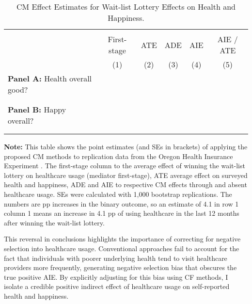 \begin{table}[h!]
    \singlespacing
    \centering
    \small
    \caption{CM Effect Estimates for Wait-list Lottery Effects on Health and Happiness.}
    \begin{tabular}{l c c c c c}
        \\[-1.8ex]\hline \hline \\[-1.8ex] 
        & First-stage & ATE & ADE & AIE & AIE / ATE \\
        \cmidrule(lr){2-6}
        & (1) & (2) & (3) & (4) & (5) \\
        \midrule
        \multicolumn{1}{l}{\textbf{Panel A:} Health overall good?} \\
        
        \\[-1.8ex]\hline \\[-1.8ex]
        \multicolumn{1}{l}{\textbf{Panel B:} Happy overall?} \\
        
        \\[-1.8ex]\hline \\[-1.8ex]
    \end{tabular}
    \vspace{-0.125cm}
    \label{tab:cm-oregon}
    \justify
    \footnotesize
    \textbf{Note:}
    This table shows the point estimates (and SEs in brackets) of applying the proposed CM methods to replication data from the Oregon Health Insurance Experiment \citep{icspr2014oregon}.
    The first-stage column to the average effect of winning the wait-list lottery on healthcare usage (mediator first-stage), ATE average effect on surveyed health and happiness, ADE and AIE to respective CM effects through and absent healthcare usage.
    SEs were calculated with 1,000 bootstrap replications.
    The numbers are pp increases in the binary outcome, so an estimate of 4.1 in row 1 column 1 means an increase in 4.1 pp of using healthcare in the last 12 months after winning the wait-list lottery.
\end{table}

This reversal in conclusions highlights the importance of correcting for negative selection into healthcare usage.
Conventional approaches fail to account for the fact that individuals with poorer underlying health tend to visit healthcare providers more frequently, generating negative selection bias that obscures the true positive AIE.
By explicitly adjusting for this bias using CF methods, I isolate a credible positive indirect effect of healthcare usage on self-reported health and happiness.

